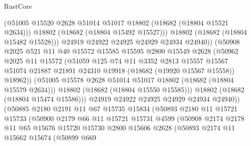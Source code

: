 \begin{lexlean}{RustCore}
\begin{coremodule}
                          (@51005 @15520 @2628 @51014 @51017 @18802 (@18682 (@18804 @15521 @2634)))
                          @18802
                          (@18682 (@18804 @15492 @15527)))
                        @18802
                        (@18682 (@18804 @15482 @15528)))
                      @24919
                      @24922
                      @24925
                      @24929
                      @24934
                      @24940))
                  (@50908
                    @2025
                    @521
                    @11
                    @40
                    @15572
                    @15585
                    @15595
                    @2800
                    @15549
                    @2628
                    (@50962
                      @2025
                      @11
                      @15572
                      (@51059
                        @125
                        @74
                        @11
                        @3352
                        @2813
                        @15557
                        @15567
                        @51074
                        @21887
                        @21891
                        @24310
                        @19918
                        (@18682 (@19920 @15567 @15558))
                        @18962))
                    (@51005 @15578 @2628 @51014 @51017 @18802 (@18682 (@18804 @15579 @2634)))
                    @18802
                    (@18682 (@18804 @15550 @15585)))
                  @18802
                  (@18682 (@18804 @15474 @15586)))
                @24919
                @24922
                @24925
                @24929
                @24934
                @24940))
            (@50885
              @2180
              @2191
              @11
              @67
              @15735
              @15834
              (@50893
                @2180
                @11
                @15721
                @15733
                (@50900
                  @2179
                  @66
                  @11
                  @15721
                  @15731
                  @4599
                  (@50908
                    @2174
                    @2178
                    @11
                    @65
                    @15676
                    @15720
                    @15730
                    @2800
                    @15606
                    @2628
                    (@50893
                      @2174
                      @11
                      @15662
                      @15674
                      (@50899
                        @669

\end{coremodule}
\end{lexlean}
